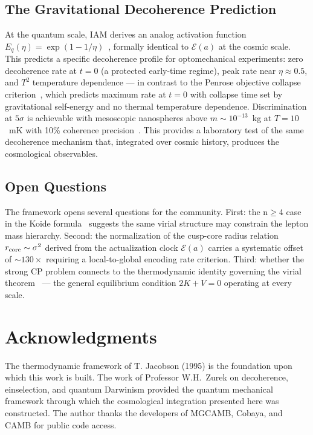 \documentclass[12pt,a4paper]{article}
\begin{document}
\subsection{The Gravitational Decoherence Prediction}

At the quantum scale, IAM derives an analog activation function
$E_q(\eta) = \exp(1 - 1/\eta)$~\citep{IAM_grav_dec}, formally identical to
$\mathcal{E}(a)$ at the cosmic scale. This predicts a specific decoherence
profile for optomechanical experiments: zero decoherence rate at $t = 0$
(a protected early-time regime), peak rate near $\eta \approx 0.5$, and
$T^2$ temperature dependence --- in contrast to the Penrose objective
collapse criterion~\citep{Penrose1996}, which predicts maximum rate
at $t = 0$ with collapse time set by gravitational self-energy and no
thermal temperature dependence.
Discrimination at $5\sigma$ is achievable with mesoscopic nanospheres above
$m \sim 10^{-13}$~kg at $T = 10$~mK with 10\% coherence
precision~\citep{IAM_grav_dec}. This provides a laboratory test of the same
decoherence mechanism that, integrated over cosmic history, produces the
cosmological observables.

\subsection{Open Questions}

The framework opens several questions for the community. First: the n$\geq$4
case in the Koide formula~\citep{IAM_koide} suggests the same virial structure
may constrain the lepton mass hierarchy. Second: the normalization of the
cusp-core radius relation $r_{\rm core} \sim \sigma^2$ derived from the
actualization clock $\mathcal{E}(a)$ carries a systematic offset of $\sim
130\times$ requiring a local-to-global encoding rate criterion. Third: whether
the strong CP problem connects to the thermodynamic identity governing
the virial theorem~\citep{IAM_thermo_virial}
--- the general equilibrium condition $2K + V = 0$ operating at every scale.

\section*{Acknowledgments}

The thermodynamic framework of T. Jacobson (1995) is the foundation upon
which this work is built. The work of Professor W.H.\ Zurek on
decoherence, einselection, and quantum Darwinism provided the quantum
mechanical framework through which the cosmological integration presented
here was constructed. The author thanks the developers of MGCAMB, Cobaya,
and CAMB for public code access.
\end{document}
